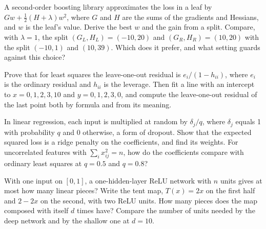 \begin{question}\label{iq:iv1:machine-learning:37}
A second-order boosting library approximates the loss in a leaf by $Gw + \frac12(H + \lambda)w^2$, where $G$ and $H$ are the sums of the gradients and Hessians, and $w$ is the leaf's value. Derive the best $w$ and the gain from a split. Compare, with $\lambda = 1$, the split $(G_L, H_L) = (-10, 20)$ and $(G_R, H_R) = (10, 20)$ with the split $(-10, 1)$ and $(10, 39)$. Which does it prefer, and what setting guards against this choice?
\end{question}

\begin{question}\label{iq:iv1:machine-learning:38}
Prove that for least squares the leave-one-out residual is $e_i/(1 - h_{ii})$, where $e_i$ is the ordinary residual and $h_{ii}$ is the leverage. Then fit a line with an intercept to $x = 0, 1, 2, 3, 10$ and $y = 0, 1, 2, 3, 0$, and compute the leave-one-out residual of the last point both by formula and from its meaning.
\end{question}

\begin{question}\label{iq:iv1:machine-learning:39}
In linear regression, each input is multiplied at random by $\delta_j/q$, where $\delta_j$ equals 1 with probability $q$ and 0 otherwise, a form of dropout. Show that the expected squared loss is a ridge penalty on the coefficients, and find its weights. For uncorrelated features with $\sum_i x_{ij}^2 = n$, how do the coefficients compare with ordinary least squares at $q = 0.5$ and $q = 0.8$?
\end{question}

\begin{question}\label{iq:iv1:machine-learning:40}
With one input on $[0, 1]$, a one-hidden-layer ReLU network with $n$ units gives at most how many linear pieces? Write the tent map, $T(x) = 2x$ on the first half and $2 - 2x$ on the second, with two ReLU units. How many pieces does the map composed with itself $d$ times have? Compare the number of units needed by the deep network and by the shallow one at $d = 10$.
\end{question}

